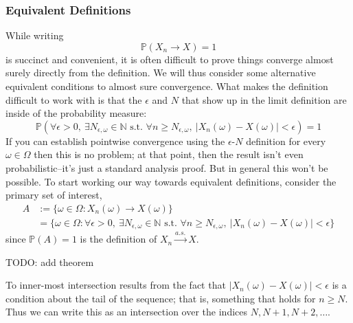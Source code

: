 \documentclass[12pt]{article}
\newcommand*{\abs}[1]{\left\lvert#1\right\rvert}
\newcommand{\Prob}{\mathbb{P}}
\begin{document}
\subsubsection{Equivalent Definitions}
While writing 
\[\Prob(X_n \to X) = 1\]
is succinct and convenient, it is often difficult to prove things converge almost surely directly from the definition. We will thus consider some alternative equivalent conditions to almost sure convergence. 
What makes the definition difficult to work with is that the $\epsilon$ and $N$ that show up in the limit definition are inside of the probability measure:
\[\Prob(\forall \epsilon > 0, \ \exists N_{\epsilon, \omega} \in \mathbb{N} \text{ s.t. } \forall n \geq N_{\epsilon, \omega}, \ \abs{X_n(\omega) - X(\omega)} < \epsilon ) = 1\]
If you can establish pointwise convergence using the $\epsilon$-$N$ definition for every $\omega \in \Omega$ then this is no problem; at that point, then the result isn't even probabilistic--it's just a 
standard analysis proof. But in general this won't be possible. To start working our way towards equivalent definitions, consider the primary set of interest,
\begin{align*}
A &:= \{\omega \in \Omega: X_n(\omega) \to X(\omega)\} \\
   &= \{\omega \in \Omega: \forall \epsilon > 0, \ \exists N_{\epsilon, \omega} \in \mathbb{N} \text{ s.t. } \forall n \geq N_{\epsilon, \omega}, \ \abs{X_n(\omega) - X(\omega)} < \epsilon\}
\end{align*}
since $\Prob(A) = 1$ is the definition of $X_n \overset{a.s.}{\to} X$. 

TODO: add theorem


To inner-most intersection results from the fact that $\abs{X_n(\omega) - X(\omega)} < \epsilon$ is a condition about the tail of the sequence; 
that is, something that holds for $n \geq N$. Thus we can write this as an intersection over the indices $N, N + 1, N + 2, \dots$. 
\end{document}
